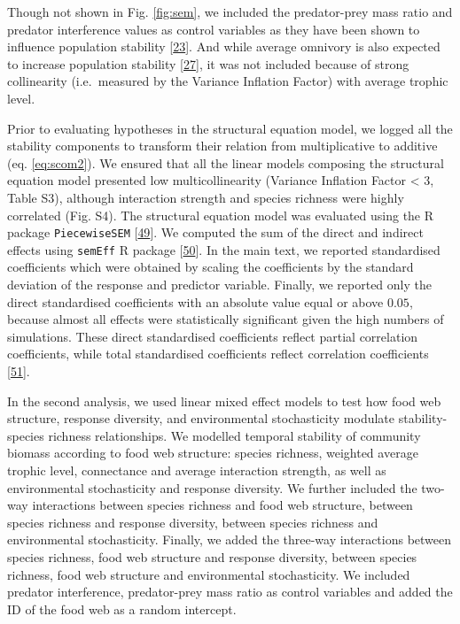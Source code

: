 \documentclass[
]{article}
\begin{document}
Though not shown in Fig. \ref{fig:sem}, we included the predator-prey mass ratio and
predator interference values as control variables as they have been shown to
influence population stability {[}\protect\hyperlink{ref-brose_allometric_2006}{23}{]}. And while average omnivory is also
expected to increase population stability {[}\protect\hyperlink{ref-mccann_reevaluating_1997}{27}{]}, it was
not included because of strong collinearity (i.e.~measured by the Variance
Inflation Factor) with average trophic level.

Prior to evaluating hypotheses in the structural equation model, we logged all
the stability components to transform their relation from multiplicative to
additive (eq. \eqref{eq:scom2}). We ensured that all the linear models composing
the structural equation model presented low multicollinearity (Variance
Inflation Factor \textless{} 3, Table S3), although interaction strength and species
richness were highly correlated (Fig. S4). The structural equation model was
evaluated using the R package \texttt{PiecewiseSEM} {[}\protect\hyperlink{ref-lefcheck_piecewisesem_2016}{49}{]}. We
computed the sum of the direct and indirect effects using \texttt{semEff} R package
{[}\protect\hyperlink{ref-murphy_semeff_2021}{50}{]}. In the main text, we reported standardised coefficients
which were obtained by scaling the coefficients by the standard deviation of
the response and predictor variable. Finally, we reported only the direct
standardised coefficients with an absolute value equal or above \(0.05\), because
almost all effects were statistically significant given the high numbers of
simulations. These direct standardised coefficients reflect partial correlation
coefficients, while total standardised coefficients reflect correlation
coefficients {[}\protect\hyperlink{ref-grace_structural_2006}{51}{]}.

In the second analysis, we used linear mixed effect models to test how food web
structure, response diversity, and environmental stochasticity modulate
stability-species richness relationships. We modelled temporal stability of
community biomass according to food web structure: species richness, weighted
average trophic level, connectance and average interaction strength, as well as
environmental stochasticity and response diversity. We further included the
two-way interactions between species richness and food web structure, between
species richness and response diversity, between species richness and
environmental stochasticity. Finally, we added the three-way interactions
between species richness, food web structure and response diversity, between
species richness, food web structure and environmental stochasticity. We
included predator interference, predator-prey mass ratio as control variables
and added the ID of the food web as a random intercept.
\end{document}
